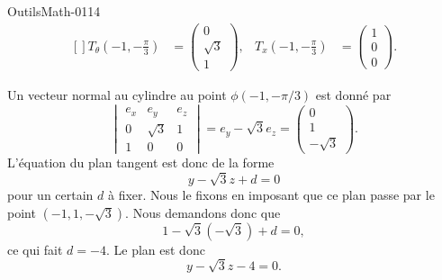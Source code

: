 \begin{corrige}{OutilsMath-0114}
\begin{equation}
\begin{aligned}[]
			T_{\theta}(-1,-\frac{ \pi }{ 3 }) & =\begin{pmatrix}
				                                     0        \\
				                                     \sqrt{3} \\
				                                     1
			                                     \end{pmatrix}, &
			T_x(-1,-\frac{ \pi }{ 3 })        & =\begin{pmatrix}
				                                     1 \\
				                                     0 \\
				                                     0
			                                     \end{pmatrix}.
		\end{aligned}
	\end{equation}

	Un vecteur normal au cylindre au point $\phi(-1,-\pi/3)$ est donné par
	\begin{equation}
		\begin{vmatrix}
			e_x & e_y      & e_z \\
			0   & \sqrt{3} & 1   \\
			1   & 0        & 0
		\end{vmatrix}=e_y-\sqrt{3}e_z=\begin{pmatrix}
			0 \\
			1 \\
			-\sqrt{3}
		\end{pmatrix}.
	\end{equation}
	L'équation du plan tangent est donc de la forme
	\begin{equation}
		y-\sqrt{3}z+d=0
	\end{equation}
	pour un certain $d$ à fixer. Nous le fixons en imposant que ce plan passe par le point $(-1,1,-\sqrt{3})$. Nous demandons donc que
	\begin{equation}
		1-\sqrt{3}(-\sqrt{3})+d=0,
	\end{equation}
	ce qui fait $d=-4$. Le plan est donc
	\begin{equation}
		y-\sqrt{3}z-4=0.
	\end{equation}

\end{corrige}
